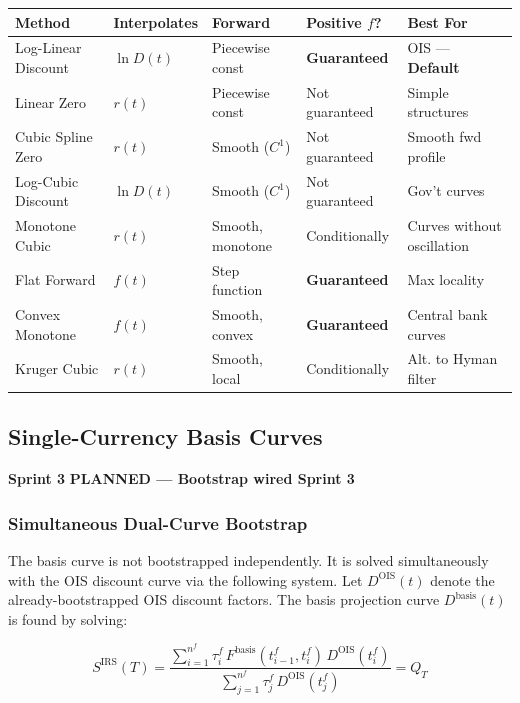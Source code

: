 \documentclass[11pt, a4paper]{article}
\newcommand{\sprintstatus}[3]{%
  \begin{tcolorbox}[sprintbox]
  \small
  \textbf{\color{navy}Sprint #1} \quad
  \textbf{\color{#2}#3}
  \end{tcolorbox}\vspace{4pt}
}
\begin{document}
\begin{center}
\small
\begin{tabular}{L{3.2cm} L{2cm} L{2cm} L{2.2cm} L{3cm}}
\toprule
\textbf{Method} & \textbf{Interpolates} & \textbf{Forward} & \textbf{Positive $f$?} & \textbf{Best For} \\
\midrule
Log-Linear Discount & $\ln D(t)$ & Piecewise const & \textbf{Guaranteed} & OIS — \textbf{Default} \\
Linear Zero & $r(t)$ & Piecewise const & Not guaranteed & Simple structures \\
Cubic Spline Zero & $r(t)$ & Smooth ($C^1$) & Not guaranteed & Smooth fwd profile \\
Log-Cubic Discount & $\ln D(t)$ & Smooth ($C^1$) & Not guaranteed & Gov't curves \\
Monotone Cubic & $r(t)$ & Smooth, monotone & Conditionally & Curves without oscillation \\
Flat Forward & $f(t)$ & Step function & \textbf{Guaranteed} & Max locality \\
Convex Monotone & $f(t)$ & Smooth, convex & \textbf{Guaranteed} & Central bank curves \\
Kruger Cubic & $r(t)$ & Smooth, local & Conditionally & Alt. to Hyman filter \\
\bottomrule
\end{tabular}
\end{center}

\subsection{Single-Currency Basis Curves}

\sprintstatus{3}{amber!80!black}{PLANNED — Bootstrap wired Sprint 3}

\subsubsection{Simultaneous Dual-Curve Bootstrap}

The basis curve is not bootstrapped independently. It is solved simultaneously
with the OIS discount curve via the following system. Let $D^{\mathrm{OIS}}(t)$
denote the already-bootstrapped OIS discount factors. The basis projection
curve $D^{\mathrm{basis}}(t)$ is found by solving:

\begin{equation}
  S^{\mathrm{IRS}}(T) =
    \frac{\sum_{i=1}^{n^f}\tau_i^f\, F^{\mathrm{basis}}(t_{i-1}^f, t_i^f)\,
          D^{\mathrm{OIS}}(t_i^f)}
         {\sum_{j=1}^{n^f}\tau_j^f\, D^{\mathrm{OIS}}(t_j^f)}
    = Q_T
\end{equation}
\end{document}
